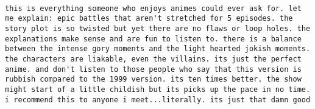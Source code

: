 \documentclass[
]{article}
\begin{document}
\begin{verbatim}
                                                                                                                                                                                                                                                                                                                                                                                                                                                                                                                                                                                                                                                                                                                                                                                                                                                                                                                                                                                                                              this is everything someone who enjoys animes could ever ask for. let me explain: epic battles that aren't stretched for 5 episodes. the story plot is so twisted but yet there are no flaws or loop holes. the explanations make sense and are fun to listen to. there is a balance between the intense gory moments and the light hearted jokish moments. the characters are liakable, even the villains. its just the perfect anime. and don't listen to those people who say that this version is rubbish compared to the 1999 version. its ten times better. the show might start of a little childish but its picks up the pace in no time. i recommend this to anyone i meet...literally. its just that damn good

\end{verbatim}
\end{document}
